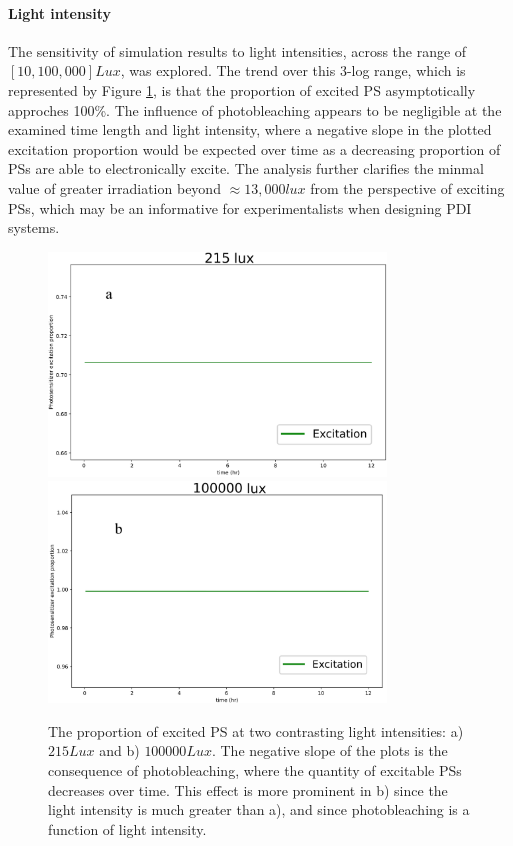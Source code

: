 \paragraph{Light intensity}
The sensitivity of simulation results to light intensities, across the range of $[10, 100,000] Lux$, was explored. The trend over this 3-log range, which is represented by Figure \ref{light_intensities}, is that the proportion of excited PS asymptotically approches 100\%. The influence of photobleaching appears to be negligible at the examined time length and light intensity, where a negative slope in the plotted excitation proportion would be expected over time as a decreasing proportion of PSs are able to electronically excite. The analysis further clarifies the minmal value of greater irradiation beyond $\approx 13,000 lux$ from the perspective of exciting PSs, which may be an informative for experimentalists when designing PDI systems.

\begin{figure}
    \centering
    \includegraphics[width = 0.8\textwidth]{images/PDIpy/sensitivity_analyses/215_lux.png} \\
    \vspace{5mm}
    \midrule
    \vspace{5mm}
    \includegraphics[width = 0.8\textwidth]{images/PDIpy/sensitivity_analyses/100000_lux.png}
    \caption{
        The proportion of excited PS at two contrasting light intensities: a) $215 Lux$ and b) $100000 Lux$. The negative slope of the plots is the consequence of photobleaching, where the quantity of excitable PSs decreases over time. This effect is more prominent in b) since the light intensity is much greater than a), and since photobleaching is a function of light intensity.
    }
    \label{light_intensities}
\end{figure}

